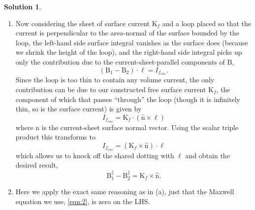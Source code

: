 \documentclass[10pt]{article}
\theoremstyle{definition}
\newtheorem{soln}{Solution}
\newcommand{\uv}[1]{\hat{\bv{{#1}}}}
\newcommand{\bv}[1]{\bm{\mathrm{#1}}}
\begin{document}
\begin{soln}
\begin{enumerate}[label=(\alph*)]
          to again be infinitesimal, the left-hand side of \cref{eqn:3} drops to zero as the area of the surface shrinks to zero and the right-hand side
          can be cut down to just the contribution of the sides of $\mathcal{C}$ parallel to the sheet,
          $$\bv{E}_1\cdot \bv{\ell}-\bv{E}_2\cdot\bv{\ell}=0$$
          where we picked up the negative sign due to the decision to traverse the curve in a right-handed manner. If we divide out the magnitude of
          $\bv{\ell}$, leaving us with the components of $\bv{E}_1$ and $\bv{E}_2$ along $\uv{\ell}$ we obtain the desired result,
          $$\bv{E}_1^\parallel-\bv{E}_2^\parallel=\bv{0}.$$
    \item Now considering the sheet of surface current $\bv{K}_f$ and a loop placed so that the current is perpendicular to the area-normal of the surface
          bounded by the loop, the left-hand side surface integral vanishes as the surface does (because we shrink the height of the loop), and
          the right-hand side integral picks up only the contribution due to the current-sheet-parallel components of $\bv{B}$,
          $$\left(\bv{B}_1-\bv{B}_2\right)\cdot\bv{\ell}=I_{f_{enc}}.$$
          Since the loop is too thin to contain any volume current, the only contribution can be due to our constructed free surface current $\bv{K}_f$,
          the component of which that passes ``through'' the loop (though it is infinitely thin, so is the surface current) is given by
          $$I_{f_{enc}}=\bv{K}_f\cdot(\uv{n}\times\bv{\ell})$$
          where $\bv{n}$ is the current-sheet surface normal vector. Using the scalar triple product this transforms to
          $$I_{f_{enc}}=(\bv{K}_f\times\uv{n})\cdot \bv{\ell}$$
          which allows us to knock off the shared dotting with $\bv{\ell}$ and obtain the desired result,
          $$\bv{B}_1^\parallel-\bv{B}_2^\parallel=\bv{K}_f\times\uv{n}.$$
    \item Here we apply the exact same reasoning as in (a), just that the Maxwell equation we use, \cref{eqn:2}, is zero on the LHS.
  \end{enumerate}
\end{soln}
\end{document}
